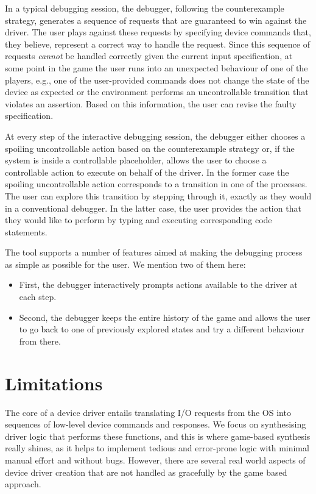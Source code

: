 In a typical debugging session, the debugger, following the counterexample strategy, generates a sequence of requests that are guaranteed to win against the driver.  The user plays against these requests by specifying device commands that, they believe, represent a correct way to handle the request.  Since this sequence of requests \emph{cannot} be handled correctly given the current input specification, at some point in the game the user runs into an unexpected behaviour of one of the players, e.g., one of the user-provided commands does not change the state of the device as expected or the environment performs an uncontrollable transition that violates an assertion.  Based on this information, the user can revise the faulty specification.

At every step of the interactive debugging session, the debugger either chooses a spoiling uncontrollable action based on the counterexample strategy or, if the system is inside a controllable placeholder, allows the user to choose a controllable action to execute on behalf of the driver.  In the former case the spoiling uncontrollable action corresponds to a transition in one of the \tsl processes.  The user can explore this transition by stepping through it, exactly as they would in a conventional debugger.  In the latter case, the user provides the action that they would like to perform by typing and executing corresponding code statements.

The tool supports a number of features aimed at making the debugging process as simple as possible for the user. We mention two of them here: 
\begin{itemize}
    \item First, the debugger interactively prompts actions available to the driver at each step.  
    \item Second, the debugger keeps the entire history of the game and allows the user to go back to one of previously explored states and try a different behaviour from there.
\end{itemize}

\section{Limitations}\label{s:limitations}

The core of a device driver entails translating I/O requests from the OS into sequences of low-level device commands and responses. We focus on synthesising driver logic that performs these functions, and this is where game-based synthesis really shines, as it helps to implement tedious and error-prone logic with minimal manual effort and without bugs. However, there are several real world aspects of device driver creation that are not handled as gracefully by the game based approach.

